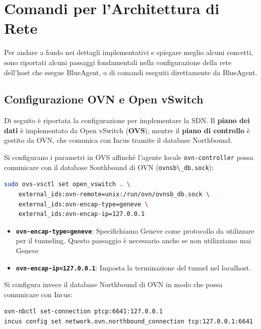 \section{Comandi per l'Architettura di
Rete}\label{comandi-per-larchitettura-di-rete}

Per andare a fondo nei dettagli implementativi e spiegare meglio alcuni
concetti, sono riportati alcuni passaggi fondamentali nella
configurazione della rete dell'host che esegue BlueAgent, o di comandi
eseguiti direttamente da BlueAgent.

\subsection{Configurazione OVN e Open
vSwitch}\label{configurazione-ovn-e-open-vswitch}

Di seguito è riportata la configurazione per implementare la SDN. Il
\textbf{piano dei dati} è implementato da Open vSwitch (\textbf{OVS}),
mentre il \textbf{piano di controllo} è gestito da OVN, che comunica con
Incus tramite il database Northbound.

Si configurano i parametri in OVS affinché l'agente locale
\passthrough{\lstinline!ovn-controller!} possa comunicare con il
database Southbound di OVN (\passthrough{\lstinline!ovnsb\_db.sock!}):

\begin{lstlisting}[language=bash]
sudo ovs-vsctl set open_vswitch . \
    external_ids:ovn-remote=unix:/run/ovn/ovnsb_db.sock \
    external_ids:ovn-encap-type=geneve \
    external_ids:ovn-encap-ip=127.0.0.1
\end{lstlisting}

\begin{itemize}
\tightlist
\item
  \textbf{\passthrough{\lstinline!ovn-encap-type=geneve!}}:
  Specifichiamo Geneve come protocollo da utilizzare per il tunneling.
  Questo passaggio è necessario anche se non utilizziamo mai Geneve
\item
  \textbf{\passthrough{\lstinline!ovn-encap-ip=127.0.0.1!}}: Imposta la
  terminazione del tunnel nel localhost.
\end{itemize}

Si configura invece il database Northbound di OVN in modo che possa
comunicare con Incus:

\begin{lstlisting}[language=bash]
ovn-nbctl set-connection ptcp:6641:127.0.0.1
incus config set network.ovn.northbound_connection tcp:127.0.0.1:6641
\end{lstlisting}

